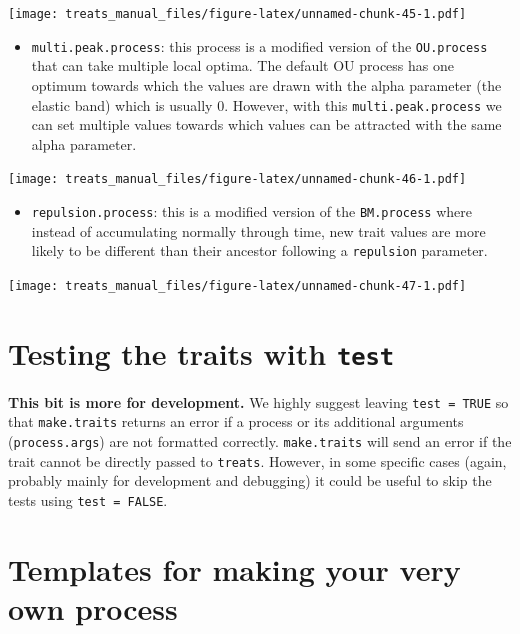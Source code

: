 \documentclass[
]{book}
\providecommand{\tightlist}{%
  \setlength{\itemsep}{0pt}\setlength{\parskip}{0pt}}
\begin{document}
\texttt{[image: treats\_manual\_files/figure-latex/unnamed-chunk-45-1.pdf]}

\begin{itemize}
\tightlist
\item
  \texttt{multi.peak.process}: this process is a modified version of the \texttt{OU.process} that can take multiple local optima. The default OU process has one optimum towards which the values are drawn with the alpha parameter (the elastic band) which is usually 0. However, with this \texttt{multi.peak.process} we can set multiple values towards which values can be attracted with the same alpha parameter.
\end{itemize}

\texttt{[image: treats\_manual\_files/figure-latex/unnamed-chunk-46-1.pdf]}

\begin{itemize}
\tightlist
\item
  \texttt{repulsion.process}: this is a modified version of the \texttt{BM.process} where instead of accumulating normally through time, new trait values are more likely to be different than their ancestor following a \texttt{repulsion} parameter.
\end{itemize}

\texttt{[image: treats\_manual\_files/figure-latex/unnamed-chunk-47-1.pdf]}

\hypertarget{testing-the-traits-with-test}{%
\section{\texorpdfstring{Testing the traits with \texttt{test}}{Testing the traits with test}}\label{testing-the-traits-with-test}}

\textbf{This bit is more for development.}
We highly suggest leaving \texttt{test\ =\ TRUE} so that \texttt{make.traits} returns an error if a process or its additional arguments (\texttt{process.args}) are not formatted correctly.
\texttt{make.traits} will send an error if the trait cannot be directly passed to \texttt{treats}.
However, in some specific cases (again, probably mainly for development and debugging) it could be useful to skip the tests using \texttt{test\ =\ FALSE}.

\hypertarget{templates-for-making-your-very-own-process}{%
\section{Templates for making your very own process}\label{templates-for-making-your-very-own-process}}
\end{document}
